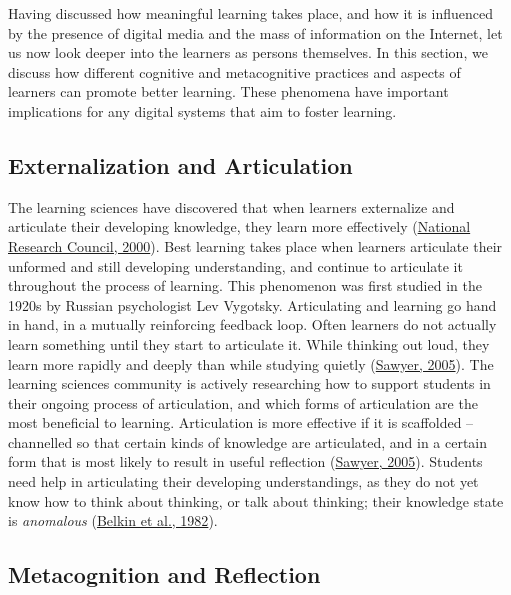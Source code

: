 \documentclass[letterpaper, nobind]{templates/ociamthesis}
\begin{document}
Having discussed how meaningful learning takes place, and how it is
influenced by the presence of digital media and the mass of information
on the Internet, let us now look deeper into the learners as persons
themselves. In this section, we discuss how different cognitive and
metacognitive practices and aspects of learners can promote better
learning. These phenomena have important implications for any digital
systems that aim to foster learning.

\hypertarget{sec-bg-learn-articulation}{%
\subsection{Externalization and Articulation}\label{sec-bg-learn-articulation}}

The learning sciences have discovered that when learners externalize and
articulate their developing knowledge, they learn more effectively
(\protect\hyperlink{ref-council2000how}{National Research Council, 2000}). Best learning takes place when learners articulate
their unformed and still developing understanding, and continue to
articulate it throughout the process of learning. This phenomenon was
first studied in the 1920s by Russian psychologist Lev Vygotsky.
Articulating and learning go hand in hand, in a mutually reinforcing
feedback loop. Often learners do not actually learn something until they
start to articulate it. While thinking out loud, they learn more rapidly
and deeply than while studying quietly (\protect\hyperlink{ref-sawyer2005cambridge}{Sawyer, 2005}). The
learning sciences community is actively researching how to support
students in their ongoing process of articulation, and which forms of
articulation are the most beneficial to learning. Articulation is more
effective if it is scaffolded -- channelled so that certain kinds of
knowledge are articulated, and in a certain form that is most likely to
result in useful reflection (\protect\hyperlink{ref-sawyer2005cambridge}{Sawyer, 2005}). Students need help
in articulating their developing understandings, as they do not yet know
how to think about thinking, or talk about thinking; their knowledge
state is \emph{anomalous} (\protect\hyperlink{ref-belkin1982ask}{Belkin et al., 1982}).

\hypertarget{sec-bg-learn-metacognition}{%
\subsection{Metacognition and Reflection}\label{sec-bg-learn-metacognition}}
\end{document}
